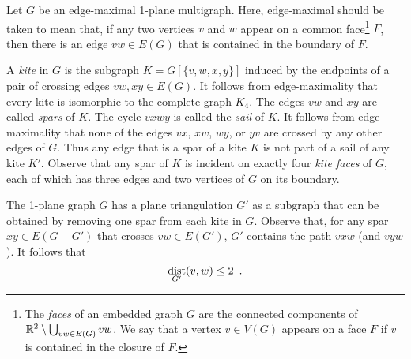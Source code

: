 \documentclass{patmorin}
\DeclareMathOperator{\dist}{dist}
\begin{document}
Let $G$ be an edge-maximal 1-plane multigraph.  Here, edge-maximal should be taken to mean that, if any two vertices $v$ and $w$ appear on a common face\footnote{The \emph{faces} of an embedded graph $G$ are the connected components of $\mathbb{R}^2\setminus \bigcup_{vw\in E(G)} vw$.  We say that a vertex $v\in V(G)$ appears on a face $F$ if $v$ is contained in the closure of $F$.} $F$, then there is an edge $vw\in E(G)$ that is contained in the boundary of $F$.

A \emph{kite} in $G$ is the subgraph $K=G[\{v,w,x,y\}]$ induced by the endpoints of a pair of crossing edges $vw,xy\in E(G)$.  It follows from edge-maximality that every kite is isomorphic to the complete graph $K_4$.
The edges $vw$ and $xy$ are called \emph{spars} of $K$.  The cycle $vxwy$ is called the \emph{sail} of $K$.  It follows from edge-maximality that none of the edges $vx$, $xw$, $wy$, or $yv$ are crossed by any other edges of $G$. Thus any edge that is a spar of a kite $K$ is not part of a sail of any kite $K'$. Observe that any spar of $K$ is incident on exactly four \emph{kite faces} of $G$, each of which has three edges and two vertices of $G$ on its boundary.

The 1-plane graph $G$ has a plane triangulation $G'$ as a subgraph that can be obtained by removing one spar from each kite in $G$.  Observe that, for any spar $xy\in E(G-G')$ that crosses $vw\in E(G')$, $G'$ contains the path $vxw$ (and $vyw$).  It follows that 
\begin{equation}
  \dist_{G'}(v,w)\le 2 \enspace . \eqlabel{spar-distance}
\end{equation}
\end{document}
